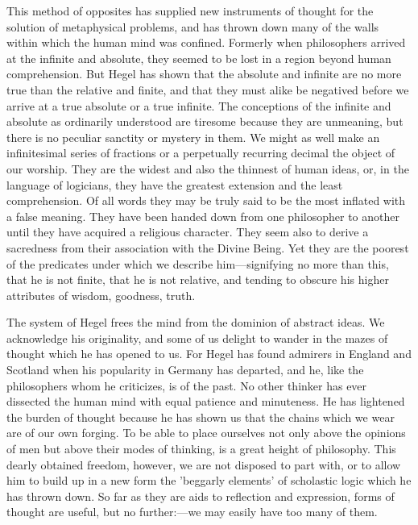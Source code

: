 \documentclass[11pt,letter]{article}
\begin{document}
\par  This method of opposites has supplied new instruments of thought for the solution of metaphysical problems, and has thrown down many of the walls within which the human mind was confined. Formerly when philosophers arrived at the infinite and absolute, they seemed to be lost in a region beyond human comprehension. But Hegel has shown that the absolute and infinite are no more true than the relative and finite, and that they must alike be negatived before we arrive at a true absolute or a true infinite. The conceptions of the infinite and absolute as ordinarily understood are tiresome because they are unmeaning, but there is no peculiar sanctity or mystery in them. We might as well make an infinitesimal series of fractions or a perpetually recurring decimal the object of our worship. They are the widest and also the thinnest of human ideas, or, in the language of logicians, they have the greatest extension and the least comprehension. Of all words they may be truly said to be the most inflated with a false meaning. They have been handed down from one philosopher to another until they have acquired a religious character. They seem also to derive a sacredness from their association with the Divine Being. Yet they are the poorest of the predicates under which we describe him—signifying no more than this, that he is not finite, that he is not relative, and tending to obscure his higher attributes of wisdom, goodness, truth.

\par  The system of Hegel frees the mind from the dominion of abstract ideas. We acknowledge his originality, and some of us delight to wander in the mazes of thought which he has opened to us. For Hegel has found admirers in England and Scotland when his popularity in Germany has departed, and he, like the philosophers whom he criticizes, is of the past. No other thinker has ever dissected the human mind with equal patience and minuteness. He has lightened the burden of thought because he has shown us that the chains which we wear are of our own forging. To be able to place ourselves not only above the opinions of men but above their modes of thinking, is a great height of philosophy. This dearly obtained freedom, however, we are not disposed to part with, or to allow him to build up in a new form the 'beggarly elements' of scholastic logic which he has thrown down. So far as they are aids to reflection and expression, forms of thought are useful, but no further:—we may easily have too many of them.
\end{document}
